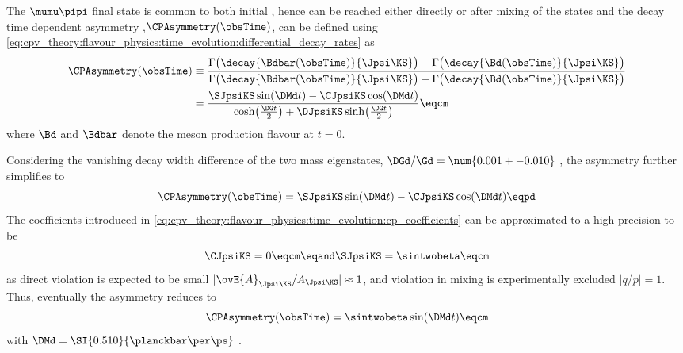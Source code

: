 The $\mumu\pipi$ final state is common to both initial \Bmesons, hence can be
reached either directly or after mixing of the \Bmeson states and the decay time
dependent \CP asymmetry ,$\CPAsymmetry(\obsTime)$, can be defined using
\cref{eq:cpv_theory:flavour_physics:time_evolution:differential_decay_rates} as
%
\begin{equation}\label{eq:cpv_theory:bd2jpsiks:cp_asymmetry}
  \begin{split}
    \CPAsymmetry(\obsTime) &\equiv 
      \frac{\Gamma\bigl(\decay{\Bdbar(\obsTime)}{\Jpsi\KS}\bigr) - \Gamma\bigl(\decay{\Bd(\obsTime)}{\Jpsi\KS}\bigr)}
           {\Gamma\bigl(\decay{\Bdbar(\obsTime)}{\Jpsi\KS}\bigr) + \Gamma\bigl(\decay{\Bd(\obsTime)}{\Jpsi\KS}\bigr)} \\
                 &= \frac{\SJpsiKS\sin(\DMd t) - \CJpsiKS\cos(\DMd t)}{\cosh\bigl(\frac{\DG t}{2}\bigr) + \DJpsiKS\sinh\bigl(\frac{\DG t}{2}\bigr)} \eqcm
  \end{split}
\end{equation}
%
where $\Bd$ and $\Bdbar$ denote the meson production flavour at $t=0$.

Considering the vanishing decay width difference of the two mass eigenstates,
$\DGd/\Gd = \num{0.001 +- 0.010}$ \cite{Amhis:2014hma}, the \CP asymmetry
further simplifies to
%
\begin{equation}\label{eq:cpv_theory:bd2jpsiks:cp_asymmetry:simplified}
  \CPAsymmetry(\obsTime) = \SJpsiKS\sin(\DMd t) - \CJpsiKS\cos(\DMd t) \eqpd
\end{equation}
%
The \CP coefficients introduced in
\cref{eq:cpv_theory:flavour_physics:time_evolution:cp_coefficients} can be
approximated to a high precision to be
%
\begin{equation}
  \CJpsiKS = 0           \eqcm\eqand 
  \SJpsiKS = \sintwobeta \eqcm
\end{equation}
%
as direct \CP violation is expected to be small
$\vert\ovE{A}_{\Jpsi\KS}/A_{\Jpsi\KS}\vert\approx 1$, and \CP violation in
mixing is experimentally excluded $\vert q/p \vert = 1$. Thus, eventually the
\CP asymmetry reduces to
%
\begin{equation}
  \CPAsymmetry(\obsTime) = \sintwobeta\sin(\DMd t) \eqcm
\end{equation}
%
with $\DMd = \SI{0.510}{\planckbar\per\ps}$ \cite{Agashe:2014kda}.

